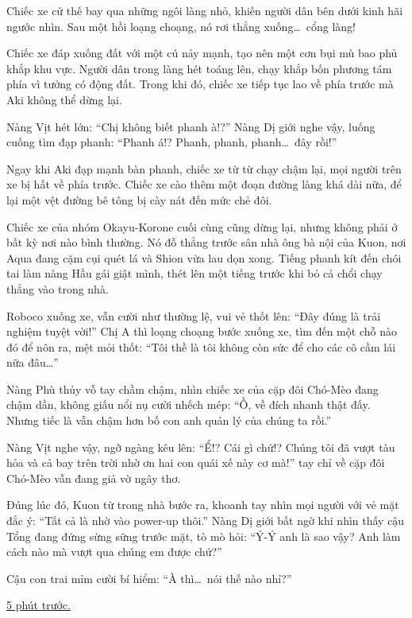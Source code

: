 \documentclass[../main.tex]{subfiles}
\begin{document}
Chiếc xe cứ thế bay qua những ngôi làng nhỏ, khiến người dân bên dưới kinh hãi ngước nhìn. Sau một hồi loạng choạng, nó rơi thẳng xuống\dots\ cổng làng!

Chiếc xe đáp xuống đất với một cú nảy mạnh, tạo nên một cơn bụi mù bao phủ khắp khu vực. Người dân trong làng hét toáng lên, chạy khắp bốn phương tám phía vì tưởng có động đất. Trong khi đó, chiếc xe tiếp tục lao về phía trước mà Aki không thể dừng lại.

Nàng Vịt hét lớn: ``Chị không biết phanh à!?'' Nàng Dị giới nghe vậy, luống cuống tìm đạp phanh: ``Phanh á!? Phanh, phanh, phanh\dots\ đây rồi!''

Ngay khi Aki đạp mạnh bàn phanh, chiếc xe từ từ chạy chậm lại, mọi người trên xe bị hất về phía trước. Chiếc xe cào thêm một đoạn đường làng khá dài nữa, để lại một vệt đường bê tông bị cày nát đến mức chẻ đôi.

Chiếc xe của nhóm Okayu-Korone cuối cùng cũng dừng lại, nhưng không phải ở bất kỳ nơi nào bình thường. Nó đỗ thẳng trước sân nhà ông bà nội của Kuon, nơi Aqua đang cặm cụi quét lá và Shion vừa lau dọn xong. Tiếng phanh kít đến chói tai làm nàng Hầu gái giật mình, thét lên một tiếng trước khi bỏ cả chổi chạy thẳng vào trong nhà.

Roboco xuống xe, vẫn cười như thường lệ, vui vẻ thốt lên: ``Đây đúng là trải nghiệm tuyệt vời!'' Chị A thì loạng choạng bước xuống xe, tìm đến một chỗ nào đó để nôn ra, mệt mỏi thốt: ``Tôi thề là tôi không còn sức để cho các cô cầm lái nữa đâu\dots''

Nàng Phù thủy vỗ tay chầm chậm, nhìn chiếc xe của cặp đôi Chó-Mèo đang chậm dần, không giấu nổi nụ cười nhếch mép: ``Ồ, về đích nhanh thật đấy. Nhưng tiếc là vẫn chậm hơn bố con anh quản lý của chúng ta rồi.''

Nàng Vịt nghe vậy, ngỡ ngàng kêu lên: ``Ể!? Cái gì chứ!? Chúng tôi đã vượt tàu hỏa và cả bay trên trời nhờ ơn hai con quái xế này cơ mà!'' tay chỉ về cặp đôi Chó-Mèo vẫn đang giả vờ ngây thơ.

Đúng lúc đó, Kuon từ trong nhà bước ra, khoanh tay nhìn mọi người với vẻ mặt đắc ý: ``Tất cả là nhờ vào power-up thôi.'' Nàng Dị giới bất ngờ khi nhìn thấy cậu Tổng đang đứng sừng sững trước mặt, tò mò hỏi: ``Ý-Ý anh là sao vậy? Anh làm cách nào mà vượt qua chúng em được chứ?''

Cậu con trai mỉm cười bí hiểm: ``À thì\dots\ nói thế nào nhỉ?''

\begin{center}
  \uline{5 phút trước.}
\end{center}
\end{document}
